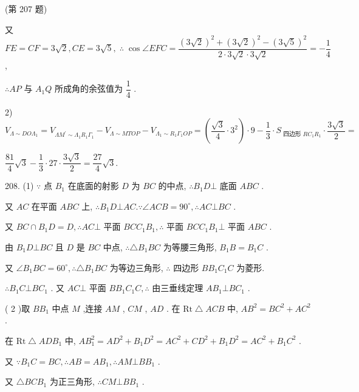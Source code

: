 (第 207 题)

又 ${FE} = {CF} = 3\sqrt{2},{CE} = 3\sqrt{5},\;\therefore \;\cos \angle {EFC} = \dfrac{{\left( 3\sqrt{2}\right) }^{2} + {\left( 3\sqrt{2}\right) }^{2} - {\left( 3\sqrt{5}\right) }^{2}}{2 \cdot  3\sqrt{2} \cdot  3\sqrt{2}} =  - \dfrac{1}{4}$ ,

$\therefore {AP}$ 与 ${A}_{1}Q$ 所成角的余弦值为 $\dfrac{1}{4}$ .

2) ${V}_{\Lambda  \sim  {DO}{\Lambda }_{1}} = {V}_{\Lambda {M}^{\prime } \sim  {\Lambda }_{1}{R}_{1}{\Gamma }_{1}} - {V}_{\Lambda  \sim  {MTOP}} - {V}_{{\Lambda }_{1} \sim  {R}_{1}{\Gamma }_{1}{OP}} = \left( {\dfrac{\sqrt{3}}{4} \cdot  {3}^{2}}\right)  \cdot  9 - \dfrac{1}{3} \cdot  {S}_{\text{ 四边形 }R{C}_{1}{R}_{1}} \cdot  \dfrac{3\sqrt{3}}{2} =$

$\dfrac{81}{4}\sqrt{3} - \dfrac{1}{3} \cdot  {27} \cdot  \dfrac{3\sqrt{3}}{2} = \dfrac{27}{4}\sqrt{3}.$

208. (1) $\because$ 点 ${B}_{1}$ 在底面的射影 $D$ 为 ${BC}$ 的中点, $\therefore {B}_{1}D \bot$ 底面 ${ABC}$ .

又 ${AC}$ 在平面 ${ABC}$ 上, $\therefore {B}_{1}D \bot  {AC}.\because \angle {ACB} = {90}^{ \circ  },\therefore {AC} \bot  {BC}$ .

又 ${BC} \cap  {B}_{1}D = D,\therefore {AC} \bot$ 平面 ${BC}{C}_{1}{B}_{1},\therefore$ 平面 ${BC}{C}_{1}{B}_{1} \bot$ 平面 ${ABC}$ .

由 ${B}_{1}D \bot  {BC}$ 且 $D$ 是 ${BC}$ 中点, $\therefore \bigtriangleup {B}_{1}{BC}$ 为等腰三角形, ${B}_{1}B = {B}_{1}C$ .

又 $\angle {B}_{1}{BC} = {60}^{ \circ  },\therefore \bigtriangleup {B}_{1}{BC}$ 为等边三角形, $\therefore$ 四边形 $B{B}_{1}{C}_{1}C$ 为菱形.

$\therefore {B}_{1}C \bot  B{C}_{1}$ . 又 ${AC} \bot$ 平面 $B{B}_{1}{C}_{1}C,\therefore$ 由三垂线定理 $A{B}_{1} \bot  B{C}_{1}$ .

( 2 )取 $B{B}_{1}$ 中点 $M$ ,连接 ${AM}$ , ${CM}$ , ${AD}$ . 在 $\mathrm{{Rt}} \bigtriangleup  {ACB}$ 中, $A{B}^{2} = B{C}^{2} + A{C}^{2}$ .

在 $\mathrm{{Rt}} \bigtriangleup  {ADB}_{1}$ 中, ${AB}_{1}^{2} = {AD}^{2} + {B}_{1}{D}^{2} = {AC}^{2} + {CD}^{2} + {B}_{1}{D}^{2} = {AC}^{2} + {B}_{1}{C}^{2}$ .

又 $\because {B}_{1}C = {BC},\therefore {AB} = A{B}_{1},\therefore {AM} \bot  B{B}_{1}$ .

又 $\bigtriangleup {BC}{B}_{1}$ 为正三角形, $\therefore {CM} \bot  B{B}_{1}$ .

